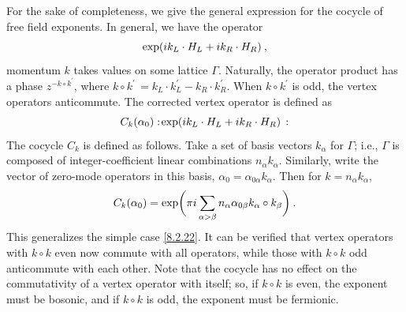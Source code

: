 	
	For the sake of completeness, we give the general expression for the cocycle of free field exponents. In general, we have the operator
	\begin{equation}
		\exp(i k_{L}\cdot H_{L} + i k_{R}\cdot H_{R}) \:, \label{10.4.26}
	\end{equation}
	momentum $k$ takes values on some lattice $\Gamma$. Naturally, the operator product has a phase $z^{-k\circ k^{\prime}}$, where $k\circ k^{\prime}\,=k_{L}\cdot k_{L}^{\prime} -k_{R}\cdot k_{R}^{\prime}$. When $k\circ k^{\prime}$ is odd, the vertex operators anticommute. The corrected vertex operator is defined as
	\begin{equation}
		C_{k}(\alpha_{0}) \mathrel{:}\!\exp(i k_{L}\cdot H_{L} + i k_{R}\cdot H_{R})\,\mathrel{:} \label{10.4.27}
	\end{equation}
	The cocycle $C_{k}$ is defined as follows. Take a set of basis vectors $k_{\alpha}$ for $\Gamma$; i.e., $\Gamma$ is composed of integer-coefficient linear combinations $n_{\alpha}k_{\alpha}$. Similarly, write the vector of zero-mode operators in this basis, $\alpha_{0}=\alpha_{0\alpha}k_{\alpha}$. Then for $k=n_{\alpha} k_{\alpha}$,
	\begin{equation}
		C_{k}(\alpha_{0})=\exp \biggl( \pi i \sum_{\alpha >\beta} 
		n_{\alpha}\alpha_{0\beta}k_{\alpha}\circ k_{\beta}\biggr) \:. \label{10.4.28} 
	\end{equation}
	This generalizes the simple case \eqref{8.2.22}. It can be verified that vertex operators with $k\circ k$ even now commute with all operators, while those with $k\circ k$ odd anticommute with each other. Note that the cocycle has no effect on the commutativity of a vertex operator with itself; so, if $k\circ k$ is even, the exponent must be bosonic, and if $k\circ k$ is odd, the exponent must be fermionic.
